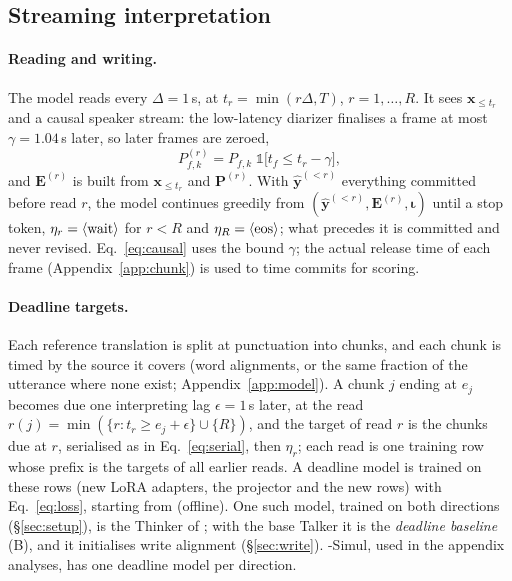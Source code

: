 \subsection{Streaming interpretation}
\label{sec:method-simul}

\paragraph{Reading and writing.} The model reads every $\Delta=1$\,s, at $t_r=\min(r\Delta,T)$, $r=1,\dots,R$. It sees
$\bm{x}_{\le t_r}$ and a causal speaker stream: the low-latency diarizer finalises a frame at most $\gamma=1.04$\,s later,
so later frames are zeroed,
\begin{equation}
P^{(r)}_{f,k}=P_{f,k}\;\mathds{1}\big[t_f\le t_r-\gamma\big],
\label{eq:causal}
\end{equation}
and $\bm{E}^{(r)}$ is built from $\bm{x}_{\le t_r}$ and $\bm{P}^{(r)}$. With $\hat{\bm{y}}^{(<r)}$ everything committed
before read $r$, the model continues greedily from $(\hat{\bm{y}}^{(<r)},\bm{E}^{(r)},\bm{\iota})$ until a stop
token, $\eta_r=\langle\mathrm{wait}\rangle$ for $r<R$ and $\eta_R=\langle\mathrm{eos}\rangle$; what precedes it is committed and never revised.
Eq.~\eqref{eq:causal} uses the bound $\gamma$; the actual release time of each frame (Appendix~\ref{app:chunk}) is used
to time commits for scoring.

\paragraph{Deadline targets.} Each reference translation is split at punctuation into chunks, and each chunk is timed by
the source it covers (word alignments, or the same fraction of the utterance where none exist; Appendix~\ref{app:model}).
A chunk $j$ ending at $e_j$ becomes due one interpreting lag $\epsilon=1$\,s later, at the read
$r(j)=\min(\{r: t_r\ge e_j+\epsilon\}\cup\{R\})$, and the target of read $r$ is the chunks due at $r$, serialised as in Eq.~\eqref{eq:serial}, then $\eta_r$; each read is
one training row whose prefix is the targets of all earlier reads. A deadline model is trained on these rows (new LoRA
adapters, the projector and the new rows) with Eq.~\eqref{eq:loss}, starting from \sys{} (offline). One such model,
trained on both directions (\S\ref{sec:setup}), is the Thinker of \sys{}; with the base Talker it is the
\emph{deadline baseline} (B), and it initialises write alignment (\S\ref{sec:write}). \sys{}-Simul, used in the
appendix analyses, has one deadline model per direction.

